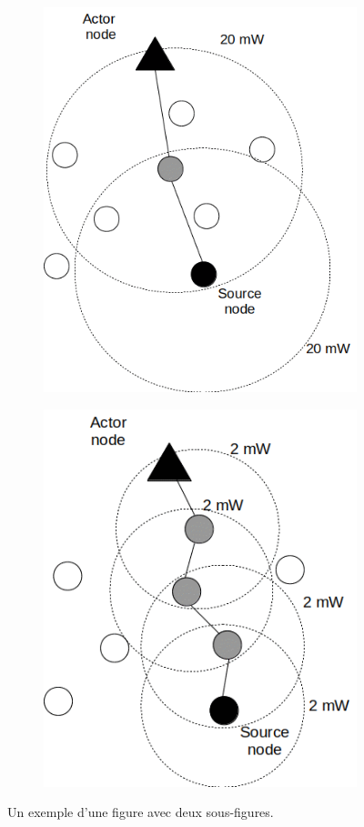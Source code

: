 \begin{figure}[h]
     \centering
     \begin{subfigure}[b]{0.4\textwidth}
         \centering
         \includegraphics[scale=0.40]{Images/Chapter4/ExempleSansAjustement.png}
         \caption{}
         \label{fig:02a}
     \end{subfigure}
     \hfill
     \begin{subfigure}[b]{0.4\textwidth}
         \centering
         \includegraphics[scale=0.40]{Images/Chapter4/ExempleAvecAjustement.png}
         \caption{}
         \label{fig:02b}
     \end{subfigure}
     \hfill
    \caption{Un exemple d'une figure avec deux sous-figures.}
    \label{fig:02}
\end{figure}

